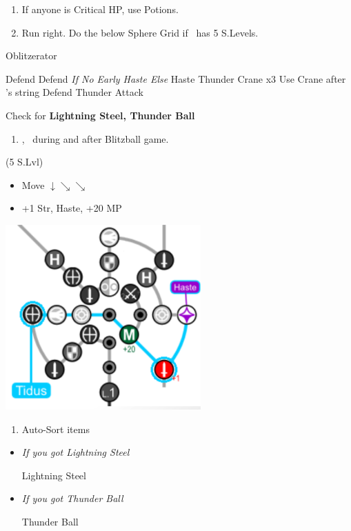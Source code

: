\begin{enumerate}[resume]
  \item If anyone is Critical HP, use Potions.
  \item Run right. Do the below Sphere Grid if \tidus\ has 5 S.Levels.
\end{enumerate}
\begin{battle}[3000]{Oblitzerator}
 \begin{itemize}
    \kimahrif Defend
    \tidusf Defend \textit{If No Early Haste Else} Haste \lulu
    \luluf Thunder Crane x3
    \tidusf Use Crane after \lulu's string
    \kimahrif Defend
    \luluf Thunder
    \tidusf Attack
  \end{itemize}
  Check for \textbf{Lightning Steel, Thunder Ball}
\end{battle}
\begin{enumerate}[resume]
  \item \cs[2:00], \sd\ during and after Blitzball game.
\end{enumerate}
\begin{spheregrid}
  \begin{itemize}
    \tidusf (5 S.Lvl)
    \begin{itemize}
	    \item Move $\downarrow \searrow\searrow$
	    \item +1 Str, Haste, +20 MP
  \end{itemize}
  \end{itemize}
  \includegraphics{graphics/haste}
\end{spheregrid}
\begin{enumerate}[resume]
  \item Auto-Sort items
  \end{enumerate}
\begin{equip}
  \begin{itemize}
    \item \textit{If you got Lightning Steel}
          \begin{itemize}
            \tidusf Lightning Steel
          \end{itemize}
   \item \textit{If you got Thunder Ball}
   		\begin{itemize}
   		\wakkaf Thunder Ball
   		\end{itemize}
  \end{itemize}
\end{equip}
